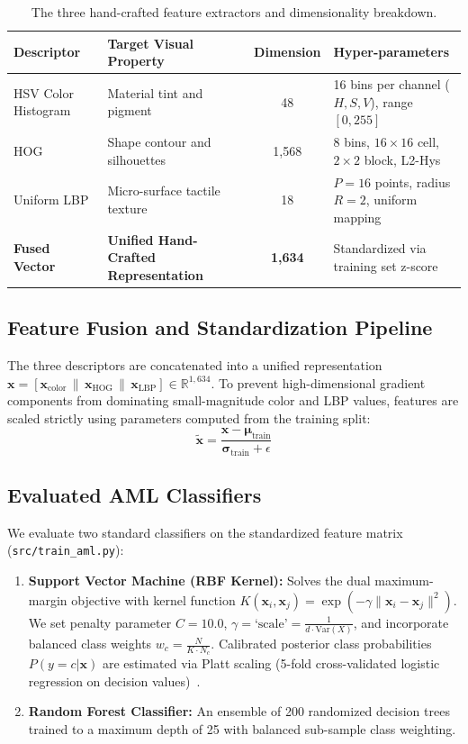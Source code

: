 \documentclass[11pt,a4paper]{article}
\begin{document}
\begin{table}[h!]
\centering
\caption{The three hand-crafted feature extractors and dimensionality breakdown.}
\label{tab:feature_extractors}
\begin{tabular}{llcl}
\toprule
\textbf{Descriptor} & \textbf{Target Visual Property} & \textbf{Dimension} & \textbf{Hyper-parameters} \\
\midrule
HSV Color Histogram & Material tint and pigment & 48 & 16 bins per channel ($H, S, V$), range $[0, 255]$ \\
HOG & Shape contour and silhouettes & 1,568 & 8 bins, $16 \times 16$ cell, $2 \times 2$ block, L2-Hys \\
Uniform LBP & Micro-surface tactile texture & 18 & $P=16$ points, radius $R=2$, uniform mapping \\
\midrule
\textbf{Fused Vector} & \textbf{Unified Hand-Crafted Representation} & \textbf{1,634} & Standardized via training set z-score \\
\bottomrule
\end{tabular}
\end{table}

\subsection{Feature Fusion and Standardization Pipeline}
The three descriptors are concatenated into a unified representation $\mathbf{x} = [\mathbf{x}_{\text{color}} \,\|\, \mathbf{x}_{\text{HOG}} \,\|\, \mathbf{x}_{\text{LBP}}] \in \mathbb{R}^{1,634}$. To prevent high-dimensional gradient components from dominating small-magnitude color and LBP values, features are scaled strictly using parameters computed from the training split:
\begin{equation}
    \tilde{\mathbf{x}} = \frac{\mathbf{x} - \boldsymbol{\mu}_{\text{train}}}{\boldsymbol{\sigma}_{\text{train}} + \epsilon}
\end{equation}

\subsection{Evaluated AML Classifiers}
We evaluate two standard classifiers on the standardized feature matrix (\texttt{src/train\_aml.py}):
\begin{enumerate}[label=\arabic*.]
    \item \textbf{Support Vector Machine (RBF Kernel):} Solves the dual maximum-margin objective with kernel function $K(\mathbf{x}_i, \mathbf{x}_j) = \exp(-\gamma \|\mathbf{x}_i - \mathbf{x}_j\|^2)$. We set penalty parameter $C=10.0$, $\gamma = \text{`scale'} = \frac{1}{d \cdot \text{Var}(X)}$, and incorporate balanced class weights $w_c = \frac{N}{K \cdot N_c}$. Calibrated posterior class probabilities $P(y=c|\mathbf{x})$ are estimated via Platt scaling (5-fold cross-validated logistic regression on decision values)~\cite{platt1999probabilistic}.
    \item \textbf{Random Forest Classifier:} An ensemble of 200 randomized decision trees~\cite{breiman2001random} trained to a maximum depth of 25 with balanced sub-sample class weighting.
\end{enumerate}
\end{document}
